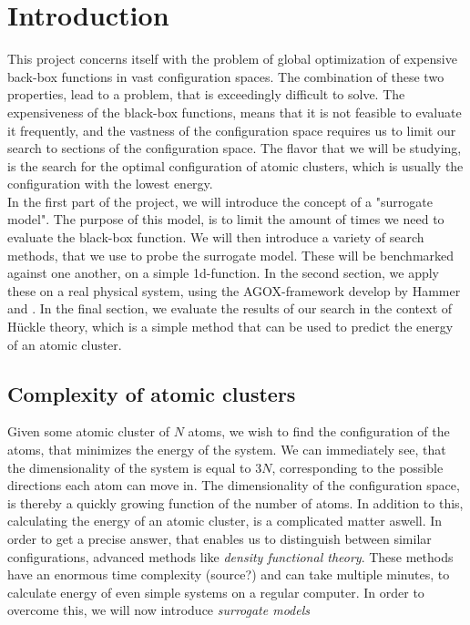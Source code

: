 \chapter{Introduction}
\label{chap:introduction}
This project concerns itself with the problem of global optimization of expensive back-box functions in vast configuration spaces. The combination of these two properties, lead to a problem, that is exceedingly difficult to solve. The expensiveness of the black-box functions, means that it is not feasible to evaluate it frequently, and the vastness of the configuration space requires us to limit our search to sections of the configuration space.  The flavor that we will be studying, is the search for the optimal configuration of atomic clusters, which is usually the configuration with the lowest energy.
\\
In the first part of the project, we will introduce the concept of a "surrogate model". The purpose of this model, is to limit the amount of times we need to evaluate the black-box function. We will then introduce a variety of search methods, that we use to probe the surrogate model. These will be benchmarked against one another, on a simple 1d-function. In the second section, we apply these on a real physical system, using the AGOX-framework develop by Hammer and {}. In the final section, we evaluate the results of our search in the context of Hückle theory, which is a simple method that can be used to predict the energy of an atomic cluster. 
\section*{Complexity of atomic clusters}
\label{sec:complexity_of_atomic_clusters}
Given some atomic cluster of $N$ atoms, we wish to find the configuration of the atoms, that minimizes the energy of the system. We can immediately see, that the dimensionality of the system is equal to $3N$, corresponding to the possible directions each atom can move in. The dimensionality of the configuration space, is thereby a quickly growing function of the number of atoms. In addition to this, calculating the energy of an atomic cluster, is a complicated matter aswell. In order to get a precise answer, that enables us to distinguish between similar configurations, advanced methods like \textit{density functional theory}. These methods have an enormous time complexity (source?) and can take multiple minutes, to calculate energy of even simple systems on a regular computer. In order to overcome this, we will now introduce \textit{surrogate models}

